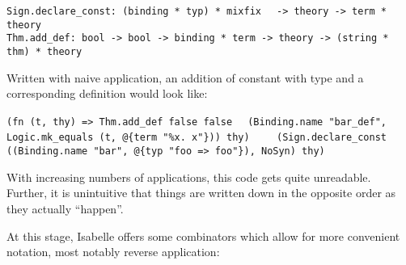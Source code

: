 \begin{isabellebody}
\begin{isamarkuptext}
  \smallskip\begin{mldecls}
  \verb|Sign.declare_const: (binding * typ) * mixfix|\isasep\isanewline%
\verb|  -> theory -> term * theory| \\
  \verb|Thm.add_def: bool -> bool -> binding * term -> theory -> (string * thm) * theory|
  \end{mldecls}

  \noindent Written with naive application, an addition of constant
   with type  and
  a corresponding definition  would look like:

  \smallskip\begin{mldecls}
  \verb|(fn (t, thy) => Thm.add_def false false|\isasep\isanewline%
\verb|  (Binding.name "bar_def", Logic.mk_equals (t, @{term "%x. x"})) thy)|\isasep\isanewline%
\verb|    (Sign.declare_const|\isasep\isanewline%
\verb|      ((Binding.name "bar", @{typ "foo => foo"}), NoSyn) thy)|
  \end{mldecls}

  \noindent With increasing numbers of applications, this code gets quite
  unreadable.  Further, it is unintuitive that things are
  written down in the opposite order as they actually ``happen''.%
\end{isamarkuptext}%
\isamarkuptrue%
%
\begin{isamarkuptext}%
\noindent At this stage, Isabelle offers some combinators which allow
  for more convenient notation, most notably reverse application:


\end{isamarkuptext}
\end{isabellebody}
